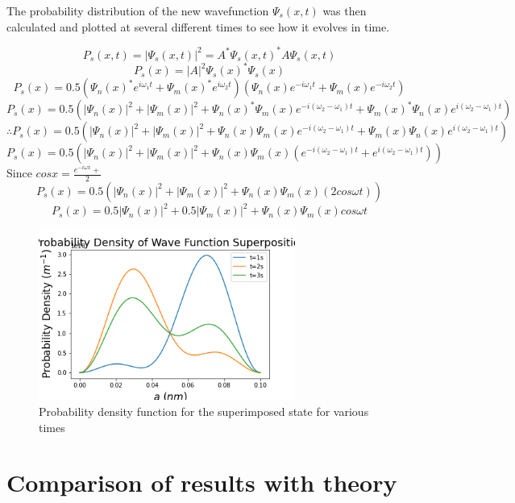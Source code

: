 The probability distribution of the new wavefunction $\Psi_s(x,t)$ was then calculated and plotted at several different times to see how it evolves in time.

$$P_s(x, t) = |\Psi_s(x, t)|^{2} = A^{*} \Psi_s (x, t)^{*} A\Psi_s (x, t)$$
$$P_s(x) = \left | A \right |^2 \Psi_s (x)^{*} \Psi_s (x)$$
$$P_s(x) = 0.5 (\Psi_n (x)^{*}e^{i \omega_{1} t} + \Psi_m (x)^{*}e^{i \omega_{2} t}) (\Psi_n (x)e^{-i \omega_{1} t} + \Psi_m (x)e^{-i \omega_{2} t})$$
$$P_s(x) = 0.5 (\left | \Psi_n (x) \right |^2 + \left | \Psi_m (x) \right |^2 + \Psi_n (x)^{*}\Psi_m (x)e^{-i(\omega_{2}- \omega_{1}) t} + \Psi_m (x)^{*}\Psi_n (x)e^{i(\omega_{2}- \omega_{1}) t})$$
$$\therefore P_s(x) =  0.5 (\left | \Psi_n (x) \right |^2 + \left | \Psi_m (x) \right |^2 + \Psi_n (x)\Psi_m (x)e^{-i(\omega_{2}- \omega_{1}) t} + \Psi_m (x)\Psi_n (x)e^{i(\omega_{2}- \omega_{1}) t})$$
$$P_s(x) = 0.5 (\left | \Psi_n (x) \right |^2 + \left | \Psi_m (x) \right |^2 + \Psi_n (x)\Psi_m (x)(e^{-i(\omega_{2}- \omega_{1}) t} + e^{i(\omega_{2}- \omega_{1}) t}))$$
Since $cosx=\frac{e^{-i\omega x}+}{2}$ 
$$P_s(x) = 0.5 (\left | \Psi_n (x) \right |^2 + \left | \Psi_m (x) \right |^2 + \Psi_n (x)\Psi_m (x)(2cos\omega t))$$
$$P_s(x) = 0.5 \left | \Psi_n (x) \right |^2 + 0.5\left | \Psi_m (x) \right |^2 + \Psi_n (x)\Psi_m (x)cos\omega t$$

\begin{figure}[h]
    \centering
    \includegraphics[width=0.75\textwidth]{lab1/superpositionPDF.png}
    \caption{Probability density function for the superimposed state for various times}
    \label{fig:superPosPDF}
\end{figure}

\section{Comparison of results with theory}

